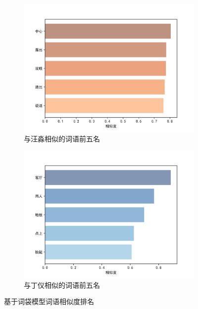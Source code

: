 \documentclass[12pt]{xjtureport}
\begin{document}
\begin{figure}[t]
    \centering
    \begin{subfigure}[b]{0.4\textwidth}
        \centering
        \includegraphics[width=\linewidth]{figures/汪淼词袋模型.png}
        \caption{与汪淼相似的词语前五名}
        \label{wangmiao}
        \end{subfigure}
    \hspace{0.05\textwidth} %
    \begin{subfigure}[b]{0.4\textwidth}
        \centering
        \includegraphics[width=\textwidth]{figures/丁仪词袋模型.png}
        \caption{与丁仪相似的词语前五名}
        \label{dingyi}
    \end{subfigure}
    \caption{基于词袋模型词语相似度排名}
    \label{combine2}
\end{figure}
\end{document}

